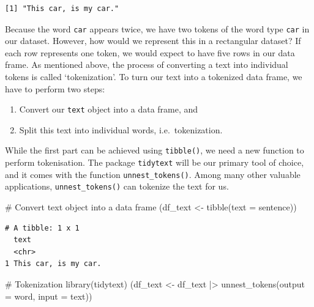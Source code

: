 \documentclass[
  letterpaper,
]{krantz}
\makeatletter
\newenvironment{Shaded}{\begin{snugshade}}{\end{snugshade}}
\newcommand{\AttributeTok}[1]{\textcolor[rgb]{0.40,0.45,0.13}{#1}}
\newcommand{\CommentTok}[1]{\textcolor[rgb]{0.37,0.37,0.37}{#1}}
\newcommand{\FunctionTok}[1]{\textcolor[rgb]{0.28,0.35,0.67}{#1}}
\newcommand{\NormalTok}[1]{\textcolor[rgb]{0.00,0.23,0.31}{#1}}
\newcommand{\OtherTok}[1]{\textcolor[rgb]{0.00,0.23,0.31}{#1}}
\newcommand{\SpecialCharTok}[1]{\textcolor[rgb]{0.37,0.37,0.37}{#1}}
\providecommand{\tightlist}{%
  \setlength{\itemsep}{0pt}\setlength{\parskip}{0pt}}\usepackage{longtable,booktabs,array}
\newenvironment{kframe}{%
\medskip{}
\setlength{\fboxsep}{.8em}
 \def\at@end@of@kframe{}%
 \ifinner\ifhmode%
  \def\at@end@of@kframe{\end{minipage}}%
  \begin{minipage}{\columnwidth}%
 \fi\fi%
 \def\FrameCommand##1{\hskip\@totalleftmargin \hskip-\fboxsep
 \colorbox{shadecolor}{##1}\hskip-\fboxsep
     \hskip-\linewidth \hskip-\@totalleftmargin \hskip\columnwidth}%
 \MakeFramed {\advance\hsize-\width
   \@totalleftmargin\z@ \linewidth\hsize
   \@setminipage}}%
 {\par\unskip\endMakeFramed%
 \at@end@of@kframe}
\renewenvironment{Shaded}{\begin{kframe}}{\end{kframe}}
\makeatother
\begin{document}
\begin{verbatim}
[1] "This car, is my car."
\end{verbatim}

Because the word \texttt{car} appears twice, we have two tokens of the
word type \texttt{car} in our dataset. However, how would we represent
this in a rectangular dataset? If each row represents one token, we
would expect to have five rows in our data frame. As mentioned above,
the process of converting a text into individual tokens is called
`tokenization'. To turn our text into a tokenized data frame, we have to
perform two steps:

\begin{enumerate}
\def\labelenumi{\arabic{enumi}.}
\tightlist
\item
  Convert our \texttt{text} object into a data frame, and
\item
  Split this text into individual words, i.e.~tokenization.
\end{enumerate}

While the first part can be achieved using \texttt{tibble()}, we need a
new function to perform tokenisation. The package \texttt{tidytext} will
be our primary tool of choice, and it comes with the function
\texttt{unnest\_tokens()}. Among many other valuable applications,
\texttt{unnest\_tokens()} can tokenize the text for us.

\begin{Shaded}
\begin{Highlighting}[]
\CommentTok{\# Convert text object into a data frame}
\NormalTok{(df\_text }\OtherTok{\textless{}{-}} \FunctionTok{tibble}\NormalTok{(}\AttributeTok{text =}\NormalTok{ sentence))}
\end{Highlighting}
\end{Shaded}

\begin{verbatim}
# A tibble: 1 x 1
  text                
  <chr>               
1 This car, is my car.
\end{verbatim}

\begin{Shaded}
\begin{Highlighting}[]
\CommentTok{\# Tokenization}
\FunctionTok{library}\NormalTok{(tidytext)}
\NormalTok{(df\_text }\OtherTok{\textless{}{-}}\NormalTok{ df\_text }\SpecialCharTok{|\textgreater{}} \FunctionTok{unnest\_tokens}\NormalTok{(}\AttributeTok{output =}\NormalTok{ word,}
                                      \AttributeTok{input =}\NormalTok{ text))}
\end{Highlighting}
\end{Shaded}
\end{document}
